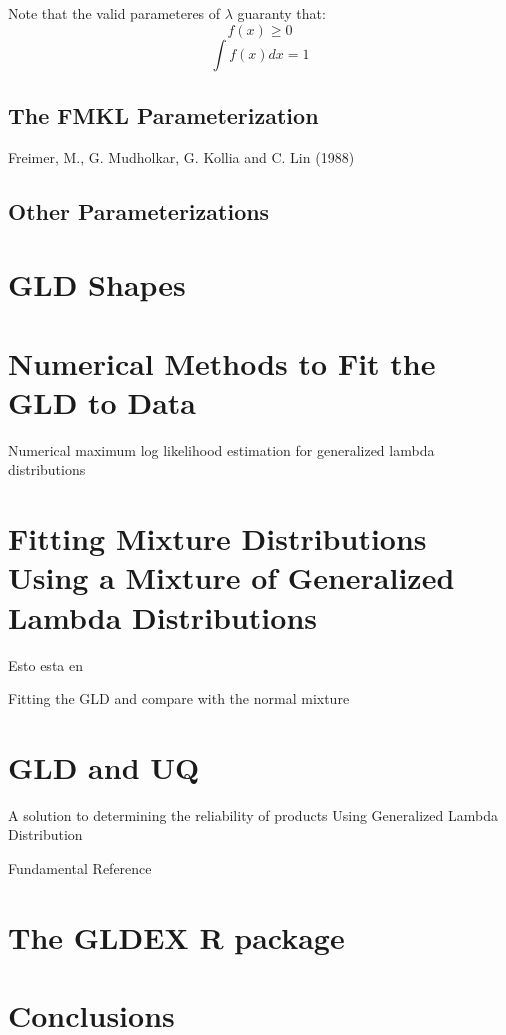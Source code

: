 Note that the valid parameteres of $\lambda$ guaranty that:
\begin{equation}
f(x) \geqslant 0
\end{equation}
\begin{equation}
\int f(x)dx=1
\end{equation}

\subsection{The FMKL Parameterization}
Freimer, M., G. Mudholkar, G. Kollia and C. Lin (1988)

\subsection{Other Parameterizations}
\cite{Lodziensis2013}
\cite{Chalabi2012}

\section{GLD Shapes}


\section{Numerical Methods to Fit the GLD to Data}
\cite{Lampasi2006}
Numerical maximum log likelihood estimation for generalized lambda distributions
\cite{Lakhany2000}
\cite{Fournier2007}
\cite{Marcondes2018}

\section{Fitting Mixture Distributions Using a Mixture of Generalized Lambda Distributions}
Esto esta en \cite{Tobergte2013}

Fitting the GLD and compare with the normal mixture \cite{Ning2008}

\section{GLD and UQ}
A solution to determining the reliability of products Using Generalized Lambda Distribution \cite{Movahedi2013}

Fundamental Reference \cite{Lampasi2006}

\section{The GLDEX R package}\label{sec:gldex}

\section{Conclusions}

